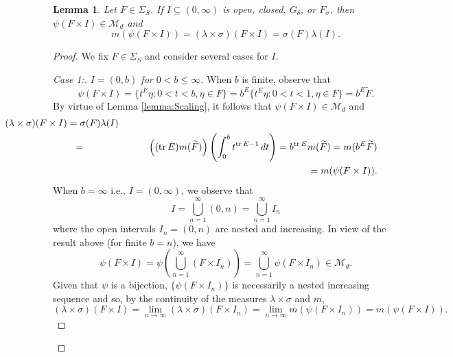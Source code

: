 \documentclass[11pt]{article}
\theoremstyle{theorem}
\newtheorem{lemma}[theorem]{Lemma}
\newcommand*{\myproofname}{Proof}
\newenvironment{subproof}[1][\myproofname]{\begin{proof}[#1]\renewcommand*{\qedsymbol}{$\mathbin{/\mkern-6mu/}$}}{\end{proof}}
\newcommand\tr{\operatorname{tr}}
\begin{document}
\begin{lemma}\label{lem:SpecialRectangle}
Let $F\in\Sigma_S$. If $I\subseteq (0,\infty)$ is open, closed, $G_\delta$, or $F_\sigma$, then $\psi(F\times I)\in\mathcal{M}_d$ and
\begin{equation}\label{eq:SpecialRectangle}
m(\psi(F\times I))=(\lambda\times\sigma)(F\times I)=\sigma(F)\lambda(I).
\end{equation}
\end{lemma}
\begin{proof}
We fix $F\in\Sigma_S$ and consider several cases for $I$.\\

\begin{subproof}[Case 1:]\textit{$I=(0,b)$ for $0<b\leq \infty$.} When $b$ is finite, observe that
\begin{equation*}
\psi(F\times I)=\{t^E\eta:0<t<b,\eta\in F\}=b^E\{t^E\eta:0<t<1,\eta \in F\}=b^E\widetilde{F}.
\end{equation*}
By virtue of Lemma \ref{lemma:Scaling}, it follows that $\psi(F\times I)\in\mathcal{M}_d$ and
\begin{eqnarray*}
\lefteqn{\hspace{-2.5cm}(\lambda\times\sigma)(F\times I)=\sigma(F)\lambda(I)}\\
&=&\left((\tr E) m(\widetilde{F})\right)\left(\int_0^b t^{\tr E-1}\,dt\right)=b^{\tr E}m(\widetilde{F})=m(b^{E}\widetilde{F})\\
&&\hspace{8cm}=m(\psi(F\times I)).
\end{eqnarray*}
When $b=\infty$ i.e., $I=(0,\infty)$, we observe that
\begin{equation*}
I=\bigcup_{n=1}^\infty (0,n)=\bigcup_{n=1}^\infty I_n
\end{equation*}
where the open intervals $I_n=(0,n)$ are nested and increasing. In view of the result above (for finite $b=n$), we have
\begin{equation*}\psi(F\times I)=\psi\left(\bigcup_{n=1}^\infty (F\times I_n)\right)=\bigcup_{n=1}^\infty\psi(F\times I_n)\in\mathcal{M}_d.
\end{equation*}
Given that $\psi$ is a bijection, $\{\psi(F\times I_n)\}$ is necessarily a nested increasing sequence and so, by the continuity of the measures $\lambda\times\sigma$ and $m$,
\begin{equation*}
(\lambda\times\sigma)(F\times I)=\lim_{n\to\infty}(\lambda\times\sigma)(F\times I_n)=\lim_{n\to\infty}m(\psi(F\times I_n))= m(\psi(F\times I)). 
\end{equation*}
\end{subproof}


\end{proof}
\end{document}
